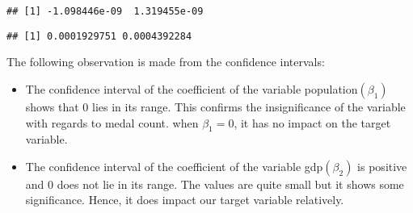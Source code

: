 \documentclass[
]{article}
\newenvironment{Shaded}{\begin{snugshade}}{\end{snugshade}}
\newcommand{\AttributeTok}[1]{\textcolor[rgb]{0.77,0.63,0.00}{#1}}
\newcommand{\CommentTok}[1]{\textcolor[rgb]{0.56,0.35,0.01}{\textit{#1}}}
\newcommand{\DecValTok}[1]{\textcolor[rgb]{0.00,0.00,0.81}{#1}}
\newcommand{\FloatTok}[1]{\textcolor[rgb]{0.00,0.00,0.81}{#1}}
\newcommand{\FunctionTok}[1]{\textcolor[rgb]{0.00,0.00,0.00}{#1}}
\newcommand{\NormalTok}[1]{#1}
\newcommand{\OtherTok}[1]{\textcolor[rgb]{0.56,0.35,0.01}{#1}}
\newcommand{\SpecialCharTok}[1]{\textcolor[rgb]{0.00,0.00,0.00}{#1}}
\providecommand{\tightlist}{%
  \setlength{\itemsep}{0pt}\setlength{\parskip}{0pt}}
\begin{document}
\begin{Shaded}
\end{Shaded}

\begin{verbatim}
## [1] -1.098446e-09  1.319455e-09
\end{verbatim}

\begin{Shaded}
\end{Shaded}

\begin{verbatim}
## [1] 0.0001929751 0.0004392284
\end{verbatim}

The following observation is made from the confidence intervals:

\begin{itemize}
\tightlist
\item
  The confidence interval of the coefficient of the variable
  population\((\beta_1)\) shows that \(0\) lies in its range. This
  confirms the insignificance of the variable with regards to medal
  count. when \(\beta_1=0\), it has no impact on the target variable.
\item
  The confidence interval of the coefficient of the variable
  gdp\((\beta_2)\) is positive and \(0\) does not lie in its range. The
  values are quite small but it shows some significance. Hence, it does
  impact our target variable relatively.
\end{itemize}
\end{document}
